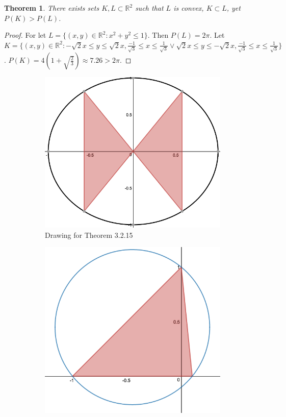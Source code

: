 \documentclass[12pt,oneside]{book}
\theoremstyle{mystyle}
\newtheorem{theorem}{Theorem}[section]
\begin{document}
\begin{theorem}
There exists sets $K,L\subset \mathbb{R}^2$ such that $L$ is convex, $K\subset L$, yet $P(K)>P(L)$.
\end{theorem}
\begin{proof}
For let $L = \{(x,y)\in \mathbb{R}^2: x^2 + y^2 \leq 1\}$. Then $P(L) = 2\pi$. Let $K = \{(x,y)\in \mathbb{R}^2: -\sqrt{2}x\leq y \leq \sqrt{2}x,\frac{-1}{\sqrt{3}} \leq x \leq \frac{1}{\sqrt{3}} \lor \sqrt{2}x\leq y \leq -\sqrt{2}x,\frac{-1}{\sqrt{3}} \leq x \leq \frac{1}{\sqrt{3}} \}$. $P(K) = 4(1+ \sqrt{\frac{2}{3}}) \approx 7.26>2\pi$.
\end{proof}

\begin{figure}[H]
  \begin{subfigure}[b]{0.49\textwidth}
     \centering
    \includegraphics[width=\textwidth]{Circles-3.png}
    \caption{Drawing for Theorem 3.2.15}
  \end{subfigure}
  \begin{subfigure}[b]{0.49\textwidth}
    \centering
    \includegraphics[width=\textwidth]{Circle-4.png}

\end{subfigure}
\end{figure}
\end{document}
